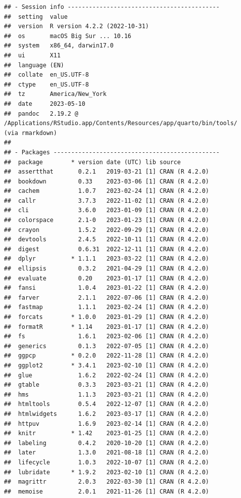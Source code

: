 \documentclass[print]{nuthesis}
\begin{document}
\begin{verbatim}
## - Session info -------------------------------------------
##  setting  value
##  version  R version 4.2.2 (2022-10-31)
##  os       macOS Big Sur ... 10.16
##  system   x86_64, darwin17.0
##  ui       X11
##  language (EN)
##  collate  en_US.UTF-8
##  ctype    en_US.UTF-8
##  tz       America/New_York
##  date     2023-05-10
##  pandoc   2.19.2 @ /Applications/RStudio.app/Contents/Resources/app/quarto/bin/tools/ (via rmarkdown)
## 
## - Packages -----------------------------------------------
##  package        * version date (UTC) lib source
##  assertthat       0.2.1   2019-03-21 [1] CRAN (R 4.2.0)
##  bookdown         0.33    2023-03-06 [1] CRAN (R 4.2.0)
##  cachem           1.0.7   2023-02-24 [1] CRAN (R 4.2.0)
##  callr            3.7.3   2022-11-02 [1] CRAN (R 4.2.0)
##  cli              3.6.0   2023-01-09 [1] CRAN (R 4.2.0)
##  colorspace       2.1-0   2023-01-23 [1] CRAN (R 4.2.0)
##  crayon           1.5.2   2022-09-29 [1] CRAN (R 4.2.0)
##  devtools         2.4.5   2022-10-11 [1] CRAN (R 4.2.0)
##  digest           0.6.31  2022-12-11 [1] CRAN (R 4.2.0)
##  dplyr          * 1.1.1   2023-03-22 [1] CRAN (R 4.2.0)
##  ellipsis         0.3.2   2021-04-29 [1] CRAN (R 4.2.0)
##  evaluate         0.20    2023-01-17 [1] CRAN (R 4.2.0)
##  fansi            1.0.4   2023-01-22 [1] CRAN (R 4.2.0)
##  farver           2.1.1   2022-07-06 [1] CRAN (R 4.2.0)
##  fastmap          1.1.1   2023-02-24 [1] CRAN (R 4.2.0)
##  forcats        * 1.0.0   2023-01-29 [1] CRAN (R 4.2.0)
##  formatR        * 1.14    2023-01-17 [1] CRAN (R 4.2.0)
##  fs               1.6.1   2023-02-06 [1] CRAN (R 4.2.0)
##  generics         0.1.3   2022-07-05 [1] CRAN (R 4.2.0)
##  ggpcp          * 0.2.0   2022-11-28 [1] CRAN (R 4.2.0)
##  ggplot2        * 3.4.1   2023-02-10 [1] CRAN (R 4.2.0)
##  glue             1.6.2   2022-02-24 [1] CRAN (R 4.2.0)
##  gtable           0.3.3   2023-03-21 [1] CRAN (R 4.2.0)
##  hms              1.1.3   2023-03-21 [1] CRAN (R 4.2.0)
##  htmltools        0.5.4   2022-12-07 [1] CRAN (R 4.2.0)
##  htmlwidgets      1.6.2   2023-03-17 [1] CRAN (R 4.2.0)
##  httpuv           1.6.9   2023-02-14 [1] CRAN (R 4.2.0)
##  knitr          * 1.42    2023-01-25 [1] CRAN (R 4.2.0)
##  labeling         0.4.2   2020-10-20 [1] CRAN (R 4.2.0)
##  later            1.3.0   2021-08-18 [1] CRAN (R 4.2.0)
##  lifecycle        1.0.3   2022-10-07 [1] CRAN (R 4.2.0)
##  lubridate      * 1.9.2   2023-02-10 [1] CRAN (R 4.2.0)
##  magrittr         2.0.3   2022-03-30 [1] CRAN (R 4.2.0)
##  memoise          2.0.1   2021-11-26 [1] CRAN (R 4.2.0)

\end{verbatim}
\end{document}
